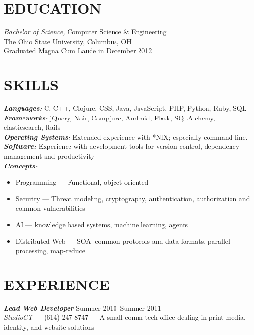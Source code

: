 \documentclass[line,letterpaper]{resume}
\begin{document}
\address{\href{http://www.ryan@ryanmcg.com}{Personal website --- www.ryanmcg.com}}
\address{\href{mailto:ryan@ryanmcg.com}{ryan@ryanmcg.com} --- (614) 678-4408}


\begin{resume}
    \vspace{-24pt}
    \section{\uppercase{Education}} {\sl Bachelor of Science,} \/
    Computer Science \& Engineering \\
    The Ohio State University, Columbus, OH \\
    Graduated Magna Cum Laude in December 2012 \\

    \vspace{-16pt}

    \section{\uppercase{Skills}}
    {\sl\textbf{Languages:}}\/
    C, C++, Clojure, CSS, Java, JavaScript, PHP, Python, Ruby, SQL \\
    {\sl\textbf{Frameworks:}}\/
    jQuery, Noir, Compjure, Android, Flask, SQLAlchemy, elasticsearch, Rails \\
    {\sl\textbf{Operating Systems:}}\/
    Extended experience with *NIX; especially command line. \\
    {\sl\textbf{Software:}}\/
    Experience with development tools for version
    control, dependency management and productivity \\
    {\sl\textbf{Concepts:}}
    \begin{itemize}
        \item Programming --- Functional, object oriented
        \item Security --- Threat modeling, cryptography, authentication,
            authorization and common vulnerabilities
        \item AI --- knowledge based systems, machine learning, agents
        \item Distributed Web --- SOA, common protocols and data formats,
            parallel processing, map-reduce
    \end{itemize}

    \vspace{-6pt}

    \section{\uppercase{Experience}} {\sl\textbf{Lead Web Developer}} \hfill
    Summer 2010--Summer 2011\\
    \emph{StudioCT} --- (614) 247-8747 --- A small comm-tech office dealing
    in print media, identity, and website solutions


\end{resume}
\end{document}
